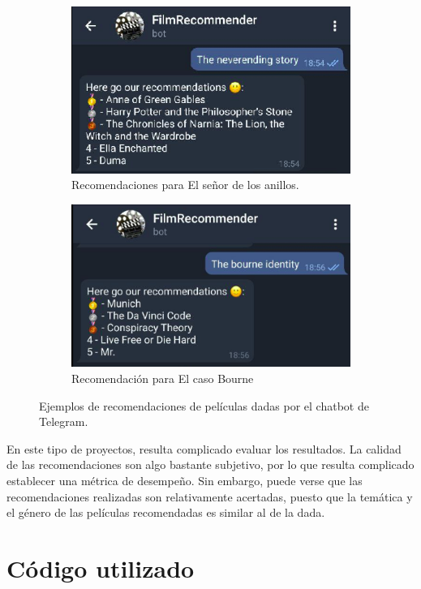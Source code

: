 \begin{figure}[H]
\begin{subfigure}{.5\textwidth}
  \centering
  \includegraphics[width=.9\linewidth]{contenido/imagenes/sc3.png}
  \caption{Recomendaciones para El señor de los anillos.}
  \label{fig:sc3}
\end{subfigure}%
\begin{subfigure}{.5\textwidth}
  \centering
  \includegraphics[width=.9\linewidth]{contenido/imagenes/sc4.png}
  \caption{Recomendación para El caso Bourne}
  \label{fig:sc4}
\end{subfigure}
\caption{Ejemplos de recomendaciones de películas dadas por el chatbot de Telegram.}
\label{fig:TelegramResults}
\end{figure}

En este tipo de proyectos, resulta complicado evaluar los resultados. La calidad de las recomendaciones son algo bastante subjetivo, por lo que resulta complicado establecer una métrica de desempeño. Sin embargo, puede verse que las recomendaciones realizadas son relativamente acertadas, puesto que la temática y el género de las películas recomendadas es similar al de la dada.\\

\section{Código utilizado}

